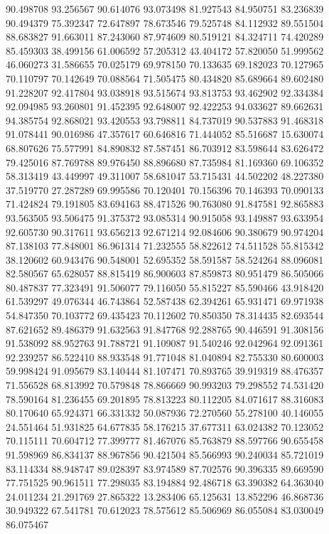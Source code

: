 90.498708
93.256567
90.614076
93.073498
81.927543
84.950751
83.236839
90.494379
75.392347
72.647897
78.673546
79.525748
84.112932
89.551504
88.683827
91.663011
87.243060
87.974609
80.519121
84.324711
74.420289
85.459303
38.499156
61.006592
57.205312
43.404172
57.820050
51.999562
46.060273
31.586655
70.025179
69.978150
70.133635
69.182023
70.127965
70.110797
70.142649
70.088564
71.505475
80.434820
85.689664
89.602480
91.228207
92.417804
93.038918
93.515674
93.813753
93.462902
92.334384
92.094985
93.260801
91.452395
92.648007
92.422253
94.033627
89.662631
94.385754
92.868021
93.420553
93.798811
84.737019
90.537883
91.468318
91.078441
90.016986
47.357617
60.646816
71.444052
85.516687
15.630074
68.807626
75.577991
84.890832
87.587451
86.703912
83.598644
83.626472
79.425016
87.769788
89.976450
88.896680
87.735984
81.169360
69.106352
58.313419
43.449997
49.311007
58.681047
53.715431
44.502202
48.227380
37.519770
27.287289
69.995586
70.120401
70.156396
70.146393
70.090133
71.424824
79.191805
83.694163
88.471526
90.763080
91.847581
92.865883
93.563505
93.506475
91.375372
93.085314
90.915058
93.149887
93.633954
92.605730
90.317611
93.656213
92.671214
92.084606
90.380679
90.974204
87.138103
77.848001
86.961314
71.232555
58.822612
74.511528
55.815342
38.120602
60.943476
90.548001
52.695352
58.591587
58.524264
88.096081
82.580567
65.628057
88.815419
86.900603
87.859873
80.951479
86.505066
80.487837
77.323491
91.506077
79.116050
55.815227
85.590466
43.918420
61.539297
49.076344
46.743864
52.587438
62.394261
65.931471
69.971938
54.847350
70.103772
69.435423
70.112602
70.850350
78.314435
82.693544
87.621652
89.486379
91.632563
91.847768
92.288765
90.446591
91.308156
91.538092
88.952763
91.788721
91.109087
91.540246
92.042964
92.091361
92.239257
86.522410
88.933548
91.771048
81.040894
82.755330
80.600003
59.998424
91.095679
83.140444
81.107471
70.893765
39.919319
88.476357
71.556528
68.813992
70.579848
78.866669
90.993203
79.298552
74.531420
78.590164
81.236455
69.201895
78.813223
80.112205
84.071617
88.316083
80.170640
65.924371
66.331332
50.087936
72.270560
55.278100
40.146055
24.551464
51.931825
64.677835
58.176215
37.677311
63.024382
70.123052
70.115111
70.604712
77.399777
81.467076
85.763879
88.597766
90.655458
91.598969
86.834137
88.967856
90.421504
85.566993
90.240034
85.721019
83.114334
88.948747
89.028397
83.974589
87.702576
90.396335
89.669590
77.751525
90.961511
77.298035
83.194884
92.486718
63.390382
64.363040
24.011234
21.291769
27.865322
13.283406
65.125631
13.852296
46.868736
30.949322
67.541781
70.612023
78.575612
85.506969
86.055084
83.030049
86.075467
